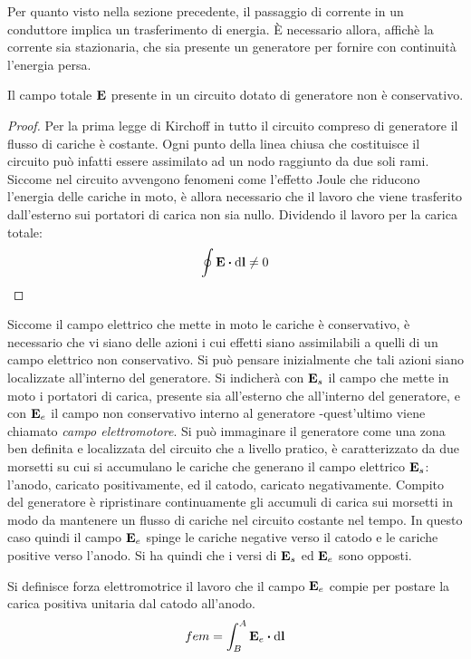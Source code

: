 Per quanto visto nella sezione precedente, il passaggio di corrente in un conduttore implica un trasferimento di energia.
È necessario allora, affichè la corrente sia stazionaria, che sia presente un generatore per fornire con continuità l'energia persa.
\begin{obs}
    Il campo totale $\vb{E}$ presente in un circuito dotato di generatore non è conservativo.
\end{obs}
\begin{proof}
    Per la prima legge di Kirchoff in tutto il circuito compreso di generatore il flusso di cariche è costante.
    Ogni punto della linea chiusa che costituisce il circuito può infatti essere assimilato ad un nodo raggiunto da due soli rami.
    Siccome nel circuito avvengono fenomeni come l'effetto Joule che riducono l'energia delle cariche in moto,
    è allora necessario che il lavoro che viene trasferito dall'esterno sui portatori di carica non sia nullo.
    Dividendo il lavoro per la carica totale:
    \[
        \oint \vb{E}\vdot\dd{\vb{l}}\neq 0
    \]
\end{proof}
Siccome il campo elettrico che mette in moto le cariche è conservativo,
è necessario che vi siano delle azioni
i cui effetti siano assimilabili a quelli di un campo elettrico non conservativo.
Si può pensare inizialmente che tali azioni siano localizzate all'interno del generatore.
Si indicherà con $\vb{E}_s$ il campo che mette in moto i portatori di carica, presente sia all'esterno che
all'interno del generatore,
e con $\vb{E}_e$ il campo non conservativo interno al generatore -quest'ultimo viene chiamato \textit{campo elettromotore}.
Si può immaginare il generatore come una zona ben definita e localizzata del circuito che a livello pratico,
è caratterizzato da due morsetti su cui si accumulano le cariche che generano il campo elettrico $\vb{E}_s$:
l'anodo, caricato positivamente, ed il catodo, caricato negativamente.
Compito del generatore è ripristinare continuamente gli accumuli di carica sui morsetti in modo da
mantenere un flusso di cariche nel circuito costante nel tempo.
In questo caso quindi il campo $\vb{E}_e$ spinge le cariche negative verso il catodo e le cariche positive verso l'anodo.
Si ha quindi che i versi di $\vb{E}_s$ ed $\vb{E}_e$ sono opposti.

\begin{defn}
    Si definisce forza elettromotrice
    il lavoro che il campo $\vb{E}_e$ compie per postare la carica positiva unitaria dal catodo all'anodo.
    \[
        fem=\int_B^A \vb{E}_e \vdot \dd{\vb{l}}
    \]
\end{defn}

